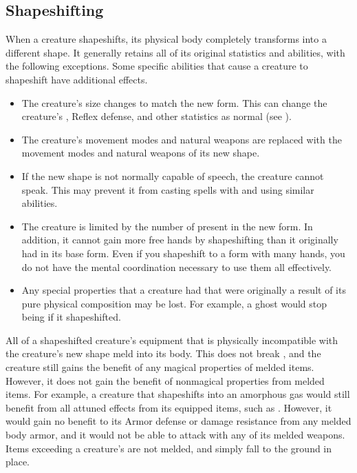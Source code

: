     \subsection{Shapeshifting}\label{Shapeshifting}
        When a creature shapeshifts, its physical body completely transforms into a different shape.
        It generally retains all of its original statistics and abilities, with the following exceptions.
        Some specific abilities that cause a creature to shapeshift have additional effects.
        \begin{itemize}
            \item The creature's size changes to match the new form.
                This can change the creature's , Reflex defense, and other statistics as normal (see ).
            \item The creature's  movement modes and natural weapons are replaced with the movement modes and natural weapons of its new shape.
            \item If the new shape is not normally capable of speech, the creature cannot speak.
                This may prevent it from casting spells with  and using similar abilities.
            \item The creature is limited by the number of  present in the new form.
                In addition, it cannot gain more free hands by shapeshifting than it originally had in its base form.
                Even if you shapeshift to a form with many hands, you do not have the mental coordination necessary to use them all effectively.
            \item Any special properties that a creature had that were originally a result of its pure physical composition may be lost.
                For example, a ghost would stop being  if it shapeshifted.
        \end{itemize}

        All of a shapeshifted creature's equipment that is physically incompatible with the creature's new shape meld into its body.
        This does not break , and the creature still gains the benefit of any magical properties of melded items.
        However, it does not gain the benefit of nonmagical properties from melded items.
        For example, a creature that shapeshifts into an amorphous gas would still benefit from all attuned effects from its equipped items, such as .
        However, it would gain no benefit to its Armor defense or damage resistance from any melded body armor, and it would not be able to attack with any of its melded weapons.
        Items exceeding a creature's  are not melded, and simply fall to the ground in place.

